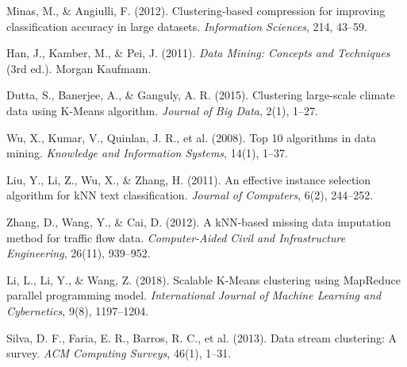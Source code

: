 \documentclass{article}
\begin{document}
\begin{thebibliography}{99}
Minas, M., \& Angiulli, F. (2012).
\newblock Clustering-based compression for improving classification accuracy in large datasets.
\newblock \textit{Information Sciences}, 214, 43–59.

Han, J., Kamber, M., \& Pei, J. (2011).
\newblock \textit{Data Mining: Concepts and Techniques} (3rd ed.).
\newblock Morgan Kaufmann.

Dutta, S., Banerjee, A., \& Ganguly, A. R. (2015).
\newblock Clustering large-scale climate data using K-Means algorithm.
\newblock \textit{Journal of Big Data}, 2(1), 1–27.

Wu, X., Kumar, V., Quinlan, J. R., et al. (2008).
\newblock Top 10 algorithms in data mining.
\newblock \textit{Knowledge and Information Systems}, 14(1), 1–37.

Liu, Y., Li, Z., Wu, X., \& Zhang, H. (2011).
\newblock An effective instance selection algorithm for kNN text classification.
\newblock \textit{Journal of Computers}, 6(2), 244–252.

Zhang, D., Wang, Y., \& Cai, D. (2012).
\newblock A kNN-based missing data imputation method for traffic flow data.
\newblock \textit{Computer-Aided Civil and Infrastructure Engineering}, 26(11), 939–952.

Li, L., Li, Y., \& Wang, Z. (2018).
\newblock Scalable K-Means clustering using MapReduce parallel programming model.
\newblock \textit{International Journal of Machine Learning and Cybernetics}, 9(8), 1197–1204.

Silva, D. F., Faria, E. R., Barros, R. C., et al. (2013).
\newblock Data stream clustering: A survey.
\newblock \textit{ACM Computing Surveys}, 46(1), 1–31.

\end{thebibliography}
\end{document}
